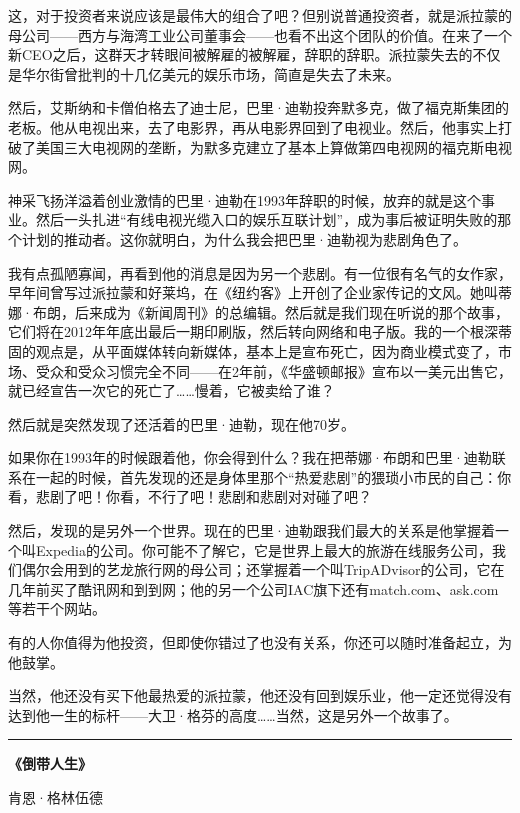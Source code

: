 这，对于投资者来说应该是最伟大的组合了吧？但别说普通投资者，就是派拉蒙的母公司------西方与海湾工业公司董事会------也看不出这个团队的价值。在来了一个新CEO之后，这群天才转眼间被解雇的被解雇，辞职的辞职。派拉蒙失去的不仅是华尔街曾批判的十几亿美元的娱乐市场，简直是失去了未来。

然后，艾斯纳和卡僧伯格去了迪士尼，巴里·迪勒投奔默多克，做了福克斯集团的老板。他从电视出来，去了电影界，再从电影界回到了电视业。然后，他事实上打破了美国三大电视网的垄断，为默多克建立了基本上算做第四电视网的福克斯电视网。

神采飞扬洋溢着创业激情的巴里·迪勒在1993年辞职的时候，放弃的就是这个事业。然后一头扎进``有线电视光缆入口的娱乐互联计划''，成为事后被证明失败的那个计划的推动者。这你就明白，为什么我会把巴里·迪勒视为悲剧角色了。

我有点孤陋寡闻，再看到他的消息是因为另一个悲剧。有一位很有名气的女作家，早年间曾写过派拉蒙和好莱坞，在《纽约客》上开创了企业家传记的文风。她叫蒂娜·布朗，后来成为《新闻周刊》的总编辑。然后就是我们现在听说的那个故事，它们将在2012年年底出最后一期印刷版，然后转向网络和电子版。我的一个根深蒂固的观点是，从平面媒体转向新媒体，基本上是宣布死亡，因为商业模式变了，市场、受众和受众习惯完全不同------在2年前，《华盛顿邮报》宣布以一美元出售它，就已经宣告一次它的死亡了\ldots\ldots 慢着，它被卖给了谁？

然后就是突然发现了还活着的巴里·迪勒，现在他70岁。

如果你在1993年的时候跟着他，你会得到什么？我在把蒂娜·布朗和巴里·迪勒联系在一起的时候，首先发现的还是身体里那个``热爱悲剧''的猥琐小市民的自己：你看，悲剧了吧！你看，不行了吧！悲剧和悲剧对对碰了吧？

然后，发现的是另外一个世界。现在的巴里·迪勒跟我们最大的关系是他掌握着一个叫Expedia的公司。你可能不了解它，它是世界上最大的旅游在线服务公司，我们偶尔会用到的艺龙旅行网的母公司；还掌握着一个叫TripADvisor的公司，它在几年前买了酷讯网和到到网；他的另一个公司IAC旗下还有match.com、ask.com等若干个网站。

有的人你值得为他投资，但即使你错过了也没有关系，你还可以随时准备起立，为他鼓掌。

当然，他还没有买下他最热爱的派拉蒙，他还没有回到娱乐业，他一定还觉得没有达到他一生的标杆------大卫·格芬的高度\ldots\ldots 当然，这是另外一个故事了。

\begin{center}\rule{0.5\linewidth}{0.5pt}\end{center}

\textbf{《倒带人生》}

肯恩·格林伍德

